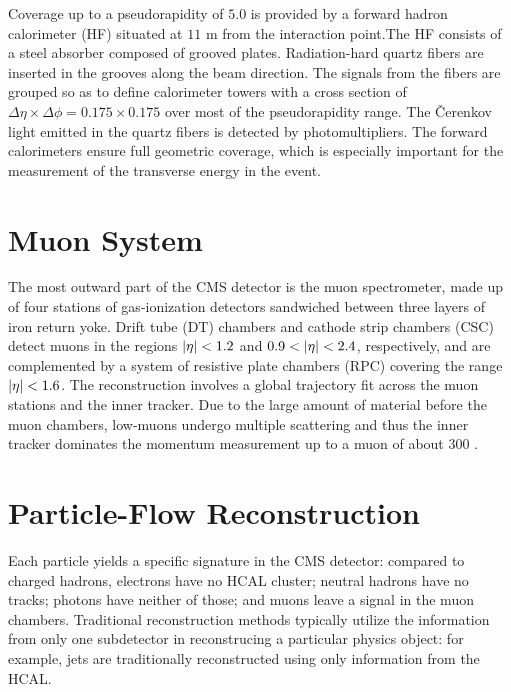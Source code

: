 Coverage up to a pseudorapidity of $5.0$ is provided by a forward
hadron calorimeter (HF) situated at $11$ \unit{m} from the interaction
point.The HF consists of a steel absorber composed of grooved
plates. Radiation-hard quartz fibers are inserted in the grooves along
the beam direction. The signals from the fibers are grouped
so as to define calorimeter towers with a cross section of $\Delta\eta\times\Delta\phi = 0.175 \times
0.175$ over most of the pseudorapidity range. The \v{C}erenkov light emitted in the
quartz fibers is detected by photomultipliers. The forward
calorimeters ensure full geometric coverage, which is especially
important for the measurement of the
transverse energy in the event.

\section{Muon System}
\label{sec:muon}

The most outward part of the CMS detector is the muon spectrometer,
made up of four stations of gas-ionization detectors sandwiched between
three layers of iron return yoke. Drift tube (DT) chambers and cathode strip chambers (CSC) detect muons
in the regions $\lvert \eta \rvert < 1.2$ and $0.9 < \lvert \eta \rvert < 2.4$,
respectively, and are complemented by a system of resistive plate
chambers (RPC) covering the range $\lvert \eta \rvert < 1.6$.  The
reconstruction involves a global trajectory fit across the muon
stations and the inner tracker. Due to the large amount of material before the muon chambers, low-\pt muons
undergo multiple scattering and thus the inner tracker dominates the
momentum measurement up to a muon \pt of about $300$ \GeV.

\section{Particle-Flow Reconstruction}
\label{sec:pf}

Each particle yields a specific signature in the CMS detector: compared to charged
hadrons, electrons have no HCAL cluster; neutral hadrons have no
tracks; photons have neither of those; and muons leave a signal in the
muon chambers. Traditional reconstruction methods typically utilize
the information from only one subdetector in reconstrucing a
particular physics object: for example, jets are traditionally
reconstructed using only information from the HCAL. 

